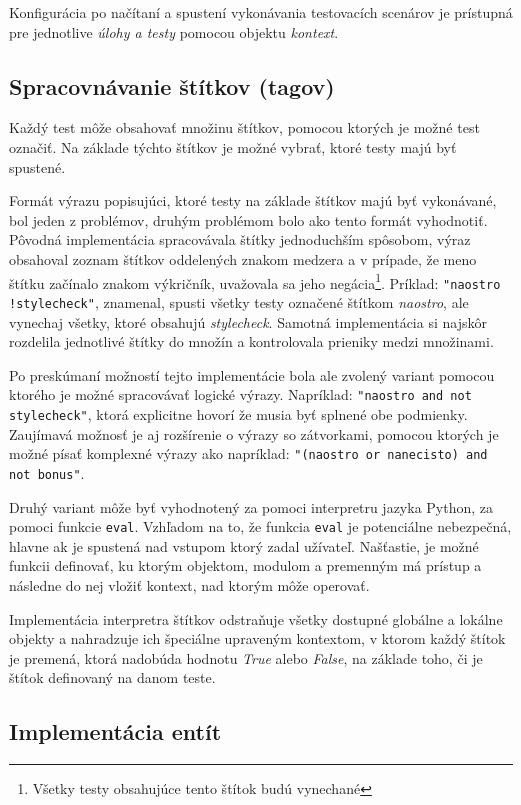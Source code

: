 \documentclass[
  digital, %
  twoside, %
  table,   %
  lof,     %
  lot,     %
]{fithesis3}
\begin{document}
Konfigurácia po načítaní a spustení vykonávania testovacích scenárov je prístupná pre jednotlive \emph{úlohy a testy} pomocou objektu \emph{kontext}.

\subsection{Spracovnávanie štítkov (tagov)}

Každý test môže obsahovať množinu štítkov, pomocou ktorých je možné test označiť.
Na základe týchto štítkov je možné vybrať, ktoré testy majú byť spustené.

Formát výrazu popisujúci, ktoré testy na základe štítkov majú byť vykonávané, bol jeden z problémov, druhým problémom bolo ako tento formát vyhodnotiť. Pôvodná implementácia spracovávala štítky jednoduchším spôsobom, výraz obsahoval zoznam štítkov oddelených znakom medzera a v prípade, že meno štítku začínalo znakom výkričník, uvažovala sa jeho negácia\footnote{Všetky testy obsahujúce tento štítok budú vynechané}. Príklad: \texttt{"naostro !stylecheck"}, znamenal, spusti všetky testy označené štítkom \emph{naostro}, ale vynechaj všetky, ktoré obsahujú \emph{stylecheck}. Samotná implementácia si najskôr rozdelila jednotlivé štítky do množín a kontrolovala prieniky medzi množinami. 

Po preskúmaní možností tejto implementácie bola ale zvolený variant pomocou ktorého je možné spracovávať logické výrazy. Napríklad: \texttt{"naostro and not stylecheck"}, ktorá explicitne hovorí že musia byť splnené obe podmienky. Zaujímavá možnosť je aj rozšírenie o výrazy so zátvorkami, pomocou ktorých je možné písať komplexné výrazy ako napríklad: \texttt{"(naostro or nanecisto) and not bonus"}. 

Druhý variant môže byť vyhodnotený za pomoci interpretru jazyka Python, za pomoci funkcie \texttt{eval}. Vzhľadom na to, že funkcia \texttt{eval} je potenciálne nebezpečná, hlavne ak je spustená nad vstupom ktorý zadal užívateľ. Našťastie, je možné funkcii definovať, ku ktorým objektom, modulom a premenným má prístup a následne do nej vložiť kontext, nad ktorým môže operovať. 

Implementácia interpretra štítkov odstraňuje všetky dostupné globálne a lokálne objekty a nahradzuje ich špeciálne upraveným kontextom, v ktorom každý štítok je premená, ktorá nadobúda hodnotu \emph{True} alebo \emph{False}, na základe toho, či je štítok definovaný na danom teste. 

\subsection{Implementácia entít}
\end{document}
